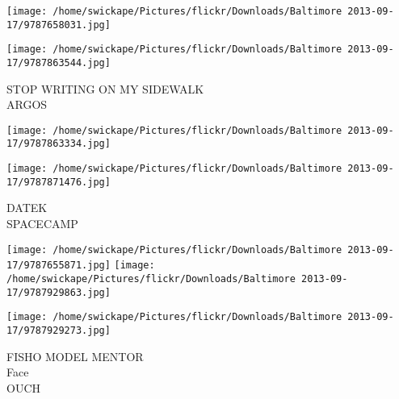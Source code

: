 \documentclass[10pt,letterpaper]{article}
\begin{document}
\texttt{[image: /home/swickape/Pictures/flickr/Downloads/Baltimore 2013-09-17/9787658031.jpg]}

\vspace{0.25in}
\texttt{[image: /home/swickape/Pictures/flickr/Downloads/Baltimore 2013-09-17/9787863544.jpg]}

STOP WRITING ON MY SIDEWALK\\
ARGOS
\pagebreak

\texttt{[image: /home/swickape/Pictures/flickr/Downloads/Baltimore 2013-09-17/9787863334.jpg]}

\vspace{0.25in}
\texttt{[image: /home/swickape/Pictures/flickr/Downloads/Baltimore 2013-09-17/9787871476.jpg]}

DATEK\\
SPACECAMP
\pagebreak

\texttt{[image: /home/swickape/Pictures/flickr/Downloads/Baltimore 2013-09-17/9787655871.jpg]}
\texttt{[image: /home/swickape/Pictures/flickr/Downloads/Baltimore 2013-09-17/9787929863.jpg]}

\texttt{[image: /home/swickape/Pictures/flickr/Downloads/Baltimore 2013-09-17/9787929273.jpg]}

FISHO MODEL MENTOR\\
Face\\
OUCH
\pagebreak
\end{document}
